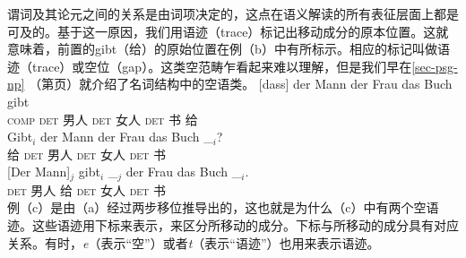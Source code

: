 谓词及其论元之间的关系是由词项决定的，这点在语义解读的所有表征层面上都是可及的。基于这一原因，我们用语迹（trace）标记出移动成分的原本位置。这就意味着，前置的gibt（给）的原始位置在例（b）中有所标示。相应的标记叫做语迹（trace）或空位（gap）。这类空范畴乍看起来难以理解，但是我们早在\ref{sec-psg-np} （第\pageref{np-epsilon}页）就介绍了名词结构中的空语类。
\eal
\ex 
\gll {}[dass] der Mann der Frau das Buch gibt\\
	 {}\spacebr{}\textsc{comp} \textsc{det} 男人 \textsc{det} 女人 \textsc{det} 书 给\\
\ex 
\gll Gibt$_i$ der Mann der Frau das Buch \_$_i$?\\
	 给 \textsc{det} 男人 \textsc{det} 女人 \textsc{det} 书\\
\ex 
\gll {}[Der Mann]$_j$ gibt$_i$ \_$_j$ der Frau das Buch \_$_i$.\\
	 {}\spacebr{}\textsc{det} 男人 给 {} \textsc{det} 女人 \textsc{det} 书\\
\zl
例（c）是由（a）经过两步移位推导出的，这也就是为什么（c）中有两个空语迹。这些语迹用下标来表示，来区分所移动的成分。下标与所移动的成分具有对应关系。有时，\emph{e}（表示“空”）或者\emph{t}（表示“语迹”）也用来表示语迹。

